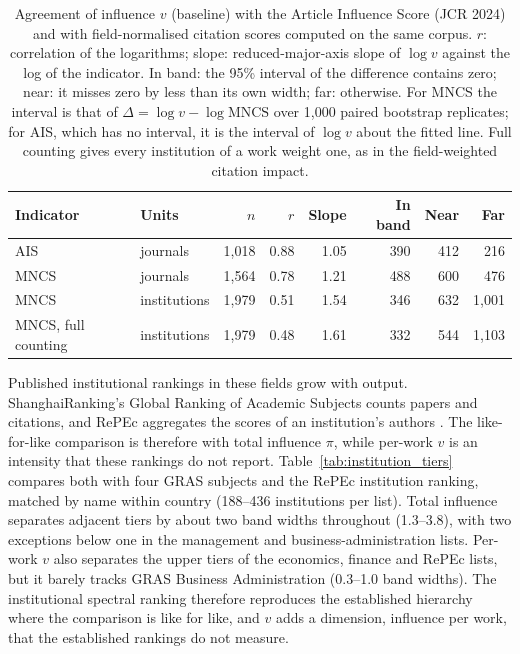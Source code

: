 \begin{table}[!htbp]
  \centering
  \small
  \caption{Agreement of influence $v$ (baseline) with the Article Influence Score (JCR 2024) and with field-normalised citation scores computed on the same corpus. $r$: correlation of the logarithms; slope: reduced-major-axis slope of $\log v$ against the log of the indicator. In band: the 95\% interval of the difference contains zero; near: it misses zero by less than its own width; far: otherwise. For MNCS the interval is that of $\Delta=\log v-\log\text{MNCS}$ over 1,000 paired bootstrap replicates; for AIS, which has no interval, it is the interval of $\log v$ about the fitted line. Full counting gives every institution of a work weight one, as in the field-weighted citation impact.}
  \label{tab:indicator_agreement}
  \begin{tabular}{llrrrrrr}
    \toprule
    Indicator & Units & $n$ & $r$ & Slope & In band & Near & Far \\
    \midrule
    AIS                     & journals     & 1,018 & 0.88 & 1.05 &   390 &   412 &   216 \\
    MNCS                    & journals     & 1,564 & 0.78 & 1.21 &   488 &   600 &   476 \\
    MNCS                    & institutions & 1,979 & 0.51 & 1.54 &   346 &   632 & 1,001 \\
    MNCS, full counting     & institutions & 1,979 & 0.48 & 1.61 &   332 &   544 & 1,103 \\
    \bottomrule
  \end{tabular}
\end{table}

Published institutional rankings in these fields grow with output. ShanghaiRanking's Global Ranking of Academic Subjects \citep[GRAS;][]{shanghairankingGRAS2025} counts papers and citations, and RePEc aggregates the scores of an institution's authors \citep{repecRankings2026}. The like-for-like comparison is therefore with total influence $\pi$, while per-work $v$ is an intensity that these rankings do not report. Table~\ref{tab:institution_tiers} compares both with four GRAS subjects and the RePEc institution ranking, matched by name within country (188--436 institutions per list). Total influence separates adjacent tiers by about two band widths throughout (1.3--3.8), with two exceptions below one in the management and business-administration lists. Per-work $v$ also separates the upper tiers of the economics, finance and RePEc lists, but it barely tracks GRAS Business Administration (0.3--1.0 band widths). The institutional spectral ranking therefore reproduces the established hierarchy where the comparison is like for like, and $v$ adds a dimension, influence per work, that the established rankings do not measure.

